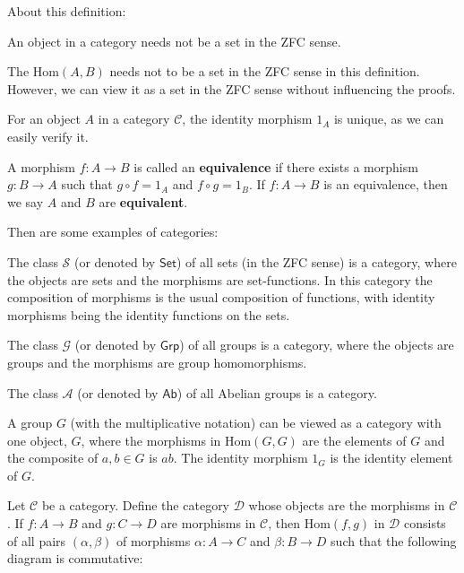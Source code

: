 \documentclass{article}
\begin{document}
\begin{Rmk}{}
    About this definition:
    \begin{compactenum}
        \item An object in a category needs not be a set in the ZFC sense. 
        \item The $\text{Hom}(A, B)$ needs not to be a set in the ZFC sense in this definition. However, we can view it as a set in the ZFC sense without influencing the proofs.
        \item \textcolor{Th}{For an object $A$ in a category $\mathscr{C}$, the identity morphism $1_A$ is unique,} as we can easily verify it.
        \item \textcolor{Df}{A morphism $f: A \to B$ is called an \textbf{equivalence} if there exists a morphism $g: B \to A$ such that $g \circ f = 1_A$ and $f \circ g = 1_B$. If $f: A \to B$ is an equivalence, then we say $A$ and $B$ are \textbf{equivalent}.}
    \end{compactenum}
    Then are some examples of categories:
    \begin{compactenum}
        \item \textcolor{Df}{The class $\mathscr{S}$ (or denoted by $\mathsf{Set}$) of all sets (in the ZFC sense)} \textcolor{Th}{is a category, where the objects are sets and the morphisms are set-functions. In this category the composition of morphisms is the usual composition of functions, with identity morphisms being the identity functions on the sets.}
        \item \textcolor{Df}{The class $\mathscr{G}$ (or denoted by $\mathsf{Grp}$) of all groups} \textcolor{Th}{is a category, where the objects are groups and the morphisms are group homomorphisms.}
        \item \textcolor{Df}{The class $\mathscr{A}$ (or denoted by $\mathsf{Ab}$) of all Abelian groups} \textcolor{Th}{is a category.}
        \item \textcolor{Th}{A group $G$ (with the multiplicative notation) can be viewed as a category with one object, $G$, where the morphisms in $\text{Hom}(G, G)$ are the elements of $G$ and the composite of $a, b \in G$ is $ab$. The identity morphism $1_G$ is the identity element of $G$.}
        \item Let $\mathscr{C}$ be a category. \textcolor{Df}{Define the} \textcolor{Th}{category} \textcolor{Df}{$\mathscr{D}$ whose objects are the morphisms in $\mathscr{C}$. If $f: A \to B$ and $g: C \to D$ are morphisms in $\mathscr{C}$, then $\text{Hom}(f, g)$ in $\mathscr{D}$ consists of all pairs $(\alpha, \beta)$ of morphisms $\alpha: A \to C$ and $\beta: B \to D$ such that the following diagram is commutative:}

\end{compactenum}
\end{Rmk}
\end{document}
